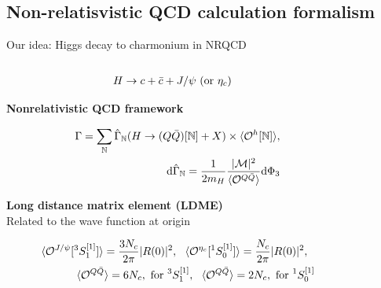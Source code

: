 \documentclass[aspectratio=169]{beamer}
\begin{document}
\subsection{Non-relatisvistic QCD calculation formalism}
\begin{frame}{Our idea: Higgs decay to charmonium in NRQCD }
	\vspace{-3mm}

	\begin{columns}
		\begin{column}{0.58\textwidth}
			\begin{small}
				\begin{eqnarray}
					H \to c  + \bar{c} + J/\psi\ ({\rm or}\ \eta_c)\nonumber
				\end{eqnarray}
				\end{small}
	\hspace{3mm}\textcolor{PittRoyal}{\bf Nonrelativistic QCD framework}
	\begin{tiny}
	\begin{eqnarray}
		&&\Gamma =\sum_\mathbb{N}  {\hat \Gamma}_\mathbb{N}(H \to(Q {\bar Q})[\mathbb{N}]+X)\times \langle {\cal O}^h[\mathbb{N}] \rangle,\nonumber \\ 
		&&\dd {\hat \Gamma}_\mathbb{N}=\frac{1}{2 m_H}\frac{|{\cal M}|^2}{\langle {\cal O}^{Q{\bar Q}}\rangle} \dd \Phi_3\nonumber
	\end{eqnarray}
	\end{tiny}
	\hspace{5mm}\textcolor{PittRoyal}{\bf Long distance matrix element (LDME)}\\
	\hspace{7mm}Related to the wave function at origin
	\begin{tiny}
	\begin{eqnarray}
		&&\langle {\cal O}^{J/\psi}[^3S_1^{[1]}] \rangle =\frac{3 N_c}{2\pi} |R(0)|^2, ~~ \langle {\cal O}^{\eta_c}[^1S_0^{[1]}] \rangle= \frac{N_c}{2\pi} |R(0)|^2,~~\nonumber \\ &&\langle {\cal O}^{Q{\bar Q}}\rangle =6 N_c ,\  {\text {\rm for }} ^3S_1^{[1]}, ~~
        \langle {\cal O}^{Q{\bar Q}}\rangle =2 N_c ,\  {\text {\rm for }} ^1S_0^{[1]} \nonumber 
	\end{eqnarray}
	\end{tiny}
\end{column}
\hspace*{-5mm}
\begin{column}{0.4\textwidth}

\end{column}
\end{columns}
\end{frame}
\end{document}
